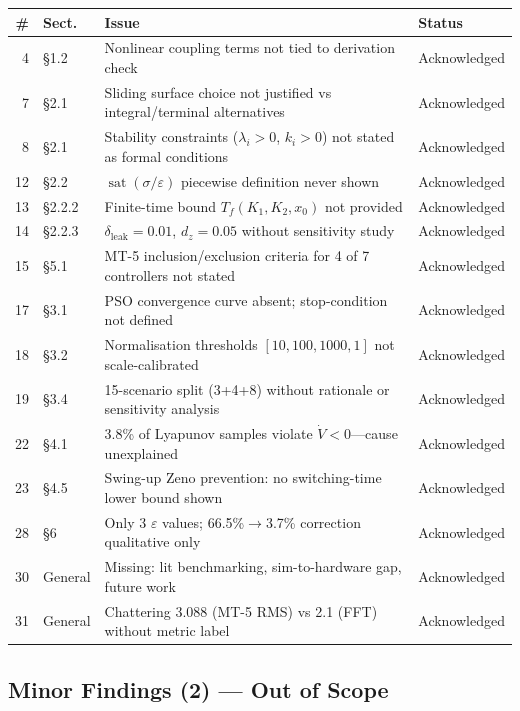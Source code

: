 \documentclass[10pt, a4paper]{article}
\newcommand{\statA}{\textcolor{headblue}{Acknowledged}}
\newcommand{\sat}{\operatorname{sat}}
\begin{document}
\begin{center}
\small
\begin{tabularx}{\columnwidth}{@{}rp{0.85cm}Xp{1.85cm}@{}}
\toprule
\textbf{\#} & \textbf{Sect.} & \textbf{Issue} & \textbf{Status} \\
\midrule
4  & \S1.2   & Nonlinear coupling terms not tied to derivation check & \statA \\
7  & \S2.1   & Sliding surface choice not justified vs integral/terminal alternatives & \statA \\
8  & \S2.1   & Stability constraints ($\lambda_i{>}0$, $k_i{>}0$) not stated as formal conditions & \statA \\
12 & \S2.2   & $\sat(\sigma/\varepsilon)$ piecewise definition never shown & \statA \\
13 & \S2.2.2 & Finite-time bound $T_f(K_1,K_2,x_0)$ not provided & \statA \\
14 & \S2.2.3 & $\delta_\text{leak}{=}0.01$, $d_z{=}0.05$ without sensitivity study & \statA \\
15 & \S5.1   & MT-5 inclusion/exclusion criteria for 4 of 7 controllers not stated & \statA \\
17 & \S3.1   & PSO convergence curve absent; stop-condition not defined & \statA \\
18 & \S3.2   & Normalisation thresholds $[10,100,1000,1]$ not scale-calibrated & \statA \\
19 & \S3.4   & 15-scenario split (3+4+8) without rationale or sensitivity analysis & \statA \\
22 & \S4.1   & 3.8\% of Lyapunov samples violate $\dot{V}{<}0$---cause unexplained & \statA \\
23 & \S4.5   & Swing-up Zeno prevention: no switching-time lower bound shown & \statA \\
28 & \S6     & Only 3 $\varepsilon$ values; 66.5\%$\to$3.7\% correction qualitative only & \statA \\
30 & General & Missing: lit benchmarking, sim-to-hardware gap, future work & \statA \\
31 & General & Chattering 3.088 (MT-5 RMS) vs 2.1 (FFT) without metric label & \statA \\
\bottomrule
\end{tabularx}
\end{center}

\subsection*{\textcolor{sevlow}{Minor Findings (2) --- Out of Scope}}
\end{document}
